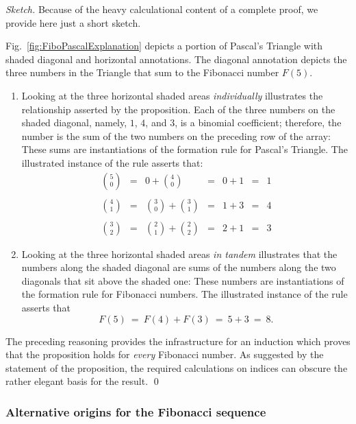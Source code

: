 \begin{proof}[Sketch]
Because of the heavy calculational content of a complete proof, we provide here just a short sketch.

\smallskip

Fig.~\ref{fig:FiboPascalExplanation} depicts a portion of Pascal's Triangle with shaded diagonal and horizontal annotations.  The diagonal annotation depicts the three numbers in the Triangle that sum to the Fibonacci number $F(5)$.
\begin{enumerate}
\item
Looking at the three horizontal shaded areas {\em individually} illustrates the relationship asserted by the proposition.  Each of the three numbers on the shaded diagonal, namely, $1$, $4$, and  $3$, is a binomial coefficient; therefore, the number is the sum of the two numbers on the preceding row of the array: These sums are instantiations of the formation rule for Pascal's Triangle.  The illustrated instance of the rule asserts that:
\[
\begin{array}{ccccccc}
{\displaystyle {5 \choose 0}}
 & = &
{\displaystyle 0 + {4 \choose 0} }
 & = &
0 + 1
 & = & 1 \\ \\
{\displaystyle {4 \choose 1}}
 & = &
{\displaystyle {3 \choose 0} + {3 \choose 1} }
 & = &
1 + 3
 & = & 4 \\ \\
{\displaystyle {3 \choose 2}}
 & = &
{\displaystyle {2 \choose 1} + {2 \choose 2} }
 & = &
2 + 1
 & = & 3
\end{array}
\]
\item
Looking at the three horizontal shaded areas {\em in tandem} illustrates that the numbers along the shaded diagonal are sums of the numbers along the two diagonals that sit above the shaded one:  These numbers are instantiations of the formation rule for Fibonacci numbers.  The
illustrated instance of the rule asserts that
\[ F(5) \ = \ F(4) + F(3) \ = \ 5 + 3 \ = \ 8. \]
\end{enumerate}

The preceding reasoning provides the infrastructure for an induction which proves that the proposition holds for {\em every} Fibonacci number.  As suggested by the statement of the proposition, the required calculations on indices can obscure the rather elegant basis for the result.  \qed
\end{proof}

\subsubsection{Alternative origins for the Fibonacci sequence}
\label{sec:Fibonacci-other-recurrences}

